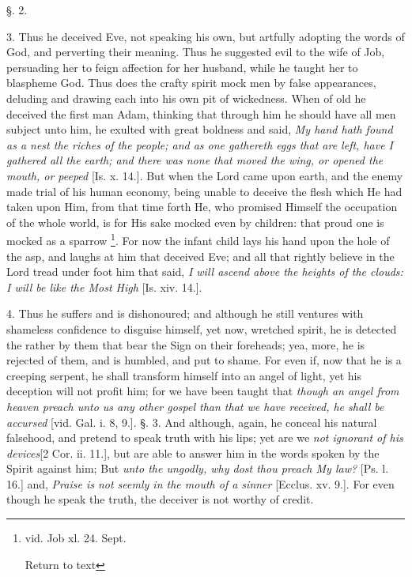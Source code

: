 §. 2.

3. Thus he deceived Eve, not speaking his own,
but artfully adopting the words of God, and perverting their meaning.
Thus he suggested evil to the wife of Job, persuading her to feign
affection for her husband, while he taught her to blaspheme God. Thus
does the crafty spirit mock men by false appearances, deluding and
drawing each into his own pit of wickedness. When of old he deceived
the first man Adam, thinking that through him he should have all men
subject unto him, he exulted with great boldness and said, \emph{My hand
hath found as a nest the riches of the people; and as one gathereth
eggs that are left, have I gathered all the earth; and there was none
that moved the wing, or opened the mouth, or peeped} [Is. x. 14.].
But when the Lord came upon earth, and the enemy made trial of his
human economy, being unable to deceive the flesh which He had taken
upon Him, from that time forth He, who promised Himself the occupation
of the whole world, is for His sake mocked even by children: that
proud one is mocked as a sparrow \footnote{vid. Job xl. 24. Sept.

Return to text}. For now the infant child lays his hand upon the hole of the
asp, and laughs at him that deceived Eve; and all that rightly believe
in the Lord tread under foot him that said, \emph{I will ascend above the
heights of the clouds: I will be like the Most High} [Is. xiv.
14.].

4. Thus he suffers and is dishonoured; and
although he still ventures with shameless confidence to disguise
himself, yet now, wretched spirit, he is detected the rather by them
that bear the Sign on their foreheads; yea, more, he is rejected of
them, and is humbled, and put to shame. For even if, now that he is a
creeping serpent, he shall transform himself into an angel of light,
yet his deception will not profit him; for we have been taught that \emph{though
an angel from heaven preach unto us any other gospel than that we have
received, he shall be accursed} [vid. Gal. i. 8, 9.]. §. 3. And
although, again, he conceal his natural falsehood, and pretend to
speak truth with his lips; yet are we \emph{not ignorant of his devices}[2
Cor. ii. 11.], but are able to answer him in the words spoken by the
Spirit against him; But \emph{unto the ungodly, why dost thou
preach My law?} [Ps. l. 16.] and, \emph{Praise is not seemly in the
mouth of a sinner} [Ecclus. xv. 9.]. For even though he speak the
truth, the deceiver is not worthy of credit.

